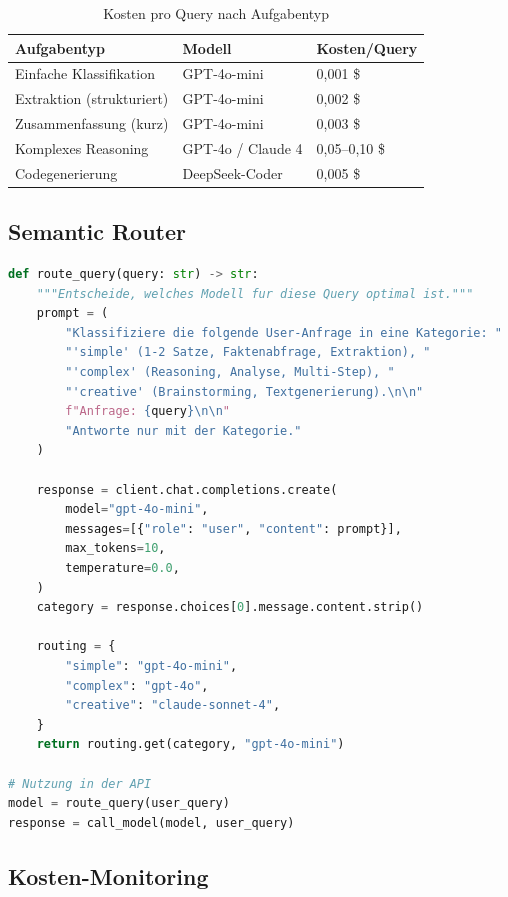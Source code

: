 \begin{table}[H]
\centering
\begin{tabularx}{\linewidth}{lXX}
\toprule
\textbf{Aufgabentyp} & \textbf{Modell} & \textbf{Kosten/Query} \\
\midrule
Einfache Klassifikation & GPT-4o-mini & 0,001 \$ \\
Extraktion (strukturiert) & GPT-4o-mini & 0,002 \$ \\
Zusammenfassung (kurz) & GPT-4o-mini & 0,003 \$ \\
Komplexes Reasoning & GPT-4o / Claude 4 & 0,05--0,10 \$ \\
Codegenerierung & DeepSeek-Coder & 0,005 \$ \\
\bottomrule
\end{tabularx}
\caption{Kosten pro Query nach Aufgabentyp}
\end{table}

\subsection{Semantic Router}

\begin{lstlisting}[language=Python, caption={Semantic Router fur Modellauswahl}, label=lst:semantic-router]
def route_query(query: str) -> str:
    """Entscheide, welches Modell fur diese Query optimal ist."""
    prompt = (
        "Klassifiziere die folgende User-Anfrage in eine Kategorie: "
        "'simple' (1-2 Satze, Faktenabfrage, Extraktion), "
        "'complex' (Reasoning, Analyse, Multi-Step), "
        "'creative' (Brainstorming, Textgenerierung).\n\n"
        f"Anfrage: {query}\n\n"
        "Antworte nur mit der Kategorie."
    )

    response = client.chat.completions.create(
        model="gpt-4o-mini",
        messages=[{"role": "user", "content": prompt}],
        max_tokens=10,
        temperature=0.0,
    )
    category = response.choices[0].message.content.strip()

    routing = {
        "simple": "gpt-4o-mini",
        "complex": "gpt-4o",
        "creative": "claude-sonnet-4",
    }
    return routing.get(category, "gpt-4o-mini")

# Nutzung in der API
model = route_query(user_query)
response = call_model(model, user_query)
\end{lstlisting}

\subsection{Kosten-Monitoring}

